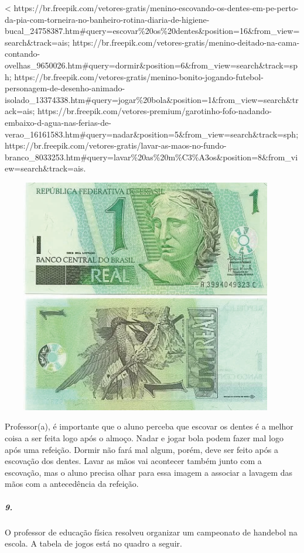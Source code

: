 \textless{}
https://br.freepik.com/vetores-gratis/menino-escovando-os-dentes-em-pe-perto-da-pia-com-torneira-no-banheiro-rotina-diaria-de-higiene-bucal\_24758387.htm\#query=escovar\%20os\%20dentes\&position=16\&from\_view=search\&track=ais;
https://br.freepik.com/vetores-gratis/menino-deitado-na-cama-contando-ovelhas\_9650026.htm\#query=dormir\&position=6\&from\_view=search\&track=sph;
https://br.freepik.com/vetores-gratis/menino-bonito-jogando-futebol-personagem-de-desenho-animado-isolado\_13374338.htm\#query=jogar\%20bola\&position=1\&from\_view=search\&track=ais;
https://br.freepik.com/vetores-premium/garotinho-fofo-nadando-embaixo-d-agua-nas-ferias-de-verao\_16161583.htm\#query=nadar\&position=5\&from\_view=search\&track=sph;
https://br.freepik.com/vetores-gratis/lavar-as-maos-no-fundo-branco\_8033253.htm\#query=lavar\%20as\%20m\%C3\%A3os\&position=8\&from\_view=search\&track=ais.

\includegraphics[width=5.00000in,height=4.05208in]{media/image64.png}

Professor(a), é importante que o aluno perceba que escovar os dentes é a
melhor coisa a ser feita logo após o almoço. Nadar e jogar bola podem
fazer mal logo após uma refeição. Dormir não fará mal algum, porém, deve
ser feito após a escovação dos dentes. Lavar as mãos vai acontecer
também junto com a escovação, mas o aluno precisa olhar para essa imagem
a associar a lavagem das mãos com a antecedência da refeição. 

\subparagraph{9.}\label{section-51}

O professor de educação física resolveu organizar um campeonato de
handebol na escola. A tabela de jogos está no quadro a seguir.

